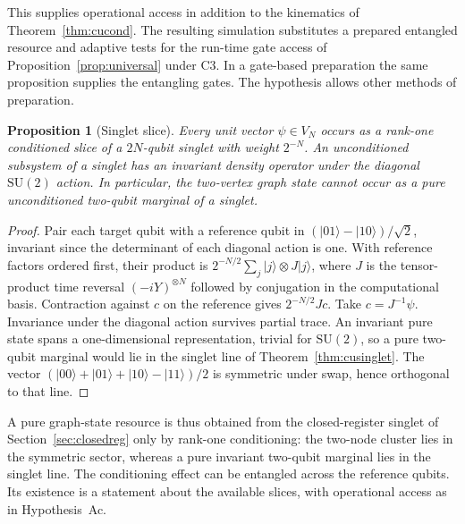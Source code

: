 \documentclass[aps,pra,onecolumn,superscriptaddress,nofootinbib,10pt]{revtex4-2}
\newtheorem{proposition}[theorem]{Proposition}
\theoremstyle{definition}
\theoremstyle{remark}
\newcommand{\SU}{\mathrm{SU}}
\begin{document}
This supplies operational access in addition to the kinematics of Theorem~\ref{thm:cucond}. The resulting simulation substitutes a prepared entangled resource and adaptive tests for the run-time gate access of Proposition~\ref{prop:universal} under C3. In a gate-based preparation the same proposition supplies the entangling gates. The hypothesis allows other methods of preparation.

\begin{proposition}[Singlet slice]\label{cp:slice}
Every unit vector $\psi\in V_N$ occurs as a rank-one conditioned slice of a $2N$-qubit singlet with weight $2^{-N}$. An unconditioned subsystem of a singlet has an invariant density operator under the diagonal $\SU(2)$ action. In particular, the two-vertex graph state cannot occur as a pure unconditioned two-qubit marginal of a singlet.
\end{proposition}
\begin{proof}
Pair each target qubit with a reference qubit in $(|01\rangle-|10\rangle)/\sqrt2$, invariant since the determinant of each diagonal action is one. With reference factors ordered first, their product is
$2^{-N/2}\sum_j |j\rangle\otimes J|j\rangle$, where $J$ is the tensor-product time reversal $(-iY)^{\otimes N}$ followed by conjugation in the computational basis. Contraction against $c$ on the reference gives $2^{-N/2}Jc$. Take $c=J^{-1}\psi$. Invariance under the diagonal action survives partial trace. An invariant pure state spans a one-dimensional representation, trivial for $\SU(2)$, so a pure two-qubit marginal would lie in the singlet line of Theorem~\ref{thm:cusinglet}. The vector $(|00\rangle+|01\rangle+|10\rangle-|11\rangle)/2$ is symmetric under swap, hence orthogonal to that line.
\end{proof}

A pure graph-state resource is thus obtained from the closed-register singlet of Section~\ref{sec:closedreg} only by
rank-one conditioning: the two-node cluster lies in the symmetric sector, whereas a pure invariant two-qubit
marginal lies in the singlet line.  The conditioning effect can be entangled across the reference qubits. Its existence is a statement about the available slices, with operational access as in Hypothesis~Ac.
\end{document}
